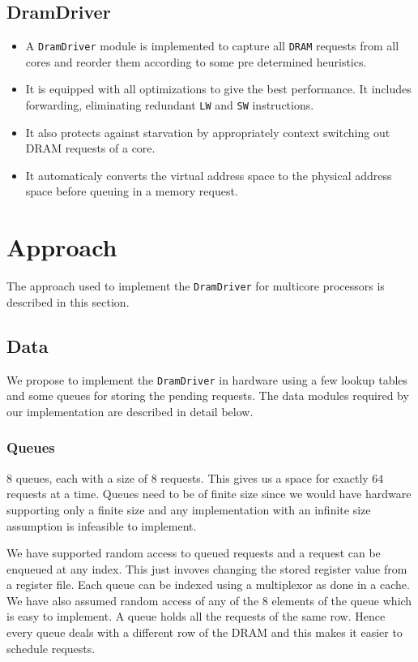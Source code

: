 \documentclass[hidelinks,12pt]{article}
\begin{document}
\subsection{DramDriver}
\begin{itemize}
    \item A \verb|DramDriver| module is implemented to capture all \verb|DRAM| requests from all cores and reorder them according to some pre determined heuristics.
    \item It is equipped with all optimizations to give the best performance. It includes forwarding, eliminating redundant \verb|LW| and \verb|SW| instructions.
    \item It also protects against starvation by appropriately context switching out DRAM requests of a core.
    \item It automaticaly converts the virtual address space to the physical address space before queuing in a memory request.
\end{itemize}

\section{Approach}

The approach used to implement the \verb|DramDriver| for multicore processors is described in this section.
\subsection{Data}
We propose to implement the \verb|DramDriver| in hardware using a few lookup tables and some queues for storing the pending requests.
The data modules required by our implementation are described in detail below.
\subsubsection{Queues}
$8$ queues, each with a size of $8$ requests. This gives us a space for exactly $64$ requests at a time.
Queues need to be of finite size since we would have hardware supporting only a finite size and any implementation with an infinite size assumption is infeasible to implement.

We have supported random access to queued requests and a request can be enqueued at any index. This just invoves changing the stored register value from a register file.
Each queue can be indexed using a multiplexor as done in a cache.
We have also assumed random access of any of the 8 elements of the queue which is easy to implement.
A queue holds all the requests of the same row. Hence every queue deals with a different row of the DRAM and this makes it easier to schedule requests.
\end{document}
